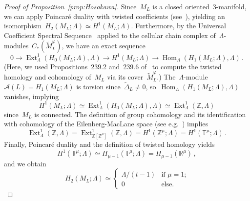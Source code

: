 \documentclass{amsart}
\newcommand{\Z}{\mathbb{Z}}
\newcommand{\R}{\mathbb{R}}
\newcommand{\A}{\mathcal{A}}
\theoremstyle{definition}
\theoremstyle{remark}
\begin{document}
\begin{proof}[Proof of Proposition~\ref{prop:Hosokawa}]
	Since~$M_L$ is a closed oriented~3-manifold, we can apply Poincaré duality with twisted coefficients (see~\cite[Theorem~243.1]{Friedl}), yielding an isomorphism~$H_2(M_L;\Lambda)\simeq H^1(M_L;\Lambda)$.
	Furthermore, by the Universal Coefficient Spectral Sequence~\cite[Theorem~2.3]{Lev77} applied
	to the cellular chain complex of~$\Lambda$-modules~$C_*(\widetilde{M}^\varphi_L)$, we have an exact sequence
	\[
	0\longrightarrow\operatorname{Ext}_\Lambda^1(H_0(M_L;\Lambda),\Lambda)\longrightarrow
	H^1(M_L;\Lambda)\longrightarrow\operatorname{Hom}_\Lambda(H_1(M_L;\Lambda),\Lambda)\,.
	\]
	(Here, we used Propositions~239.2 and~239.6 of~\cite{Friedl} to compute the twisted homology and cohomology
	of~$M_L$ via its cover~$\widetilde{M}_L^\varphi$.)
	 The~$\Lambda$-module~$\A(L)=H_1(M_L;\Lambda)$ is torsion since~$\widetilde\Delta_L\neq 0$, so~$\operatorname{Hom}_\Lambda(H_1(M_L;\Lambda),\Lambda)$ vanishes, implying
	 \[
	 H^1(M_L;\Lambda)\simeq\operatorname{Ext}_\Lambda^1(H_0(M_L;\Lambda),\Lambda)\simeq\operatorname{Ext}_\Lambda^1(\Z,\Lambda)
	 \]
	 since~$M_L$ is connected. The definition of group cohomology and its identification
	 with cohomology of the Eilenberg-MacLane space (see e.g.~\cite[Chapter~I, Proposition~4.2]{Bro94}) implies
	 \[
	 \operatorname{Ext}_\Lambda^1(\Z,\Lambda)=\operatorname{Ext}_{\Z[\Z^\mu]}^1(\Z,\Lambda)=H^1(\Z^\mu;\Lambda)=H^1(\mathbb{T}^\mu;\Lambda)\,.
	 \]
	 Finally, Poincaré duality and the definition of twisted homology yields
	 \[
	 H^1(\mathbb{T}^\mu;\Lambda)\simeq H_{\mu-1}(\mathbb{T}^\mu;\Lambda)=H_{\mu-1}(\R^\mu)\,,
	 \]
	and we obtain
	\begin{equation}
	\label{eq:H2ML}
	H_2(M_L;\Lambda)\simeq \begin{cases}\Lambda/(t-1)&\text{if~$\mu=1$;}\\ 0&\text{else}.\end{cases}
	\end{equation}
	

\end{proof}
\end{document}
